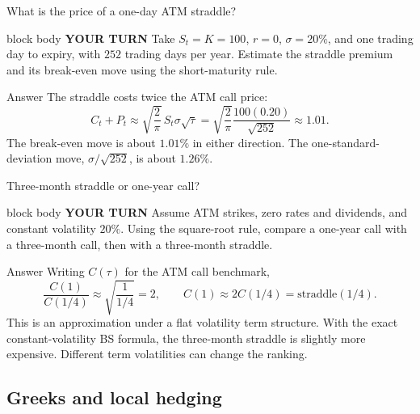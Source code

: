 \documentclass[handout,10pt,aspectratio=169]{beamer}
\newenvironment{pausebox}{\begin{beamercolorbox}[rounded=true,sep=0.8em,wd=\textwidth]{block body}
  \textbf{\color{CourseGold}YOUR TURN}\quad}{\end{beamercolorbox}}
\newcommand{\1}{\mathbf 1}
\begin{document}
\begin{frame}{What is the price of a one-day ATM straddle?}
\begin{pausebox}
Take \(S_t=K=100\), \(r=0\), \(\sigma=20\%\), and one trading day to
expiry, with \(252\) trading days per year. Estimate the straddle premium
and its break-even move using the short-maturity rule.
\end{pausebox}

\begin{exampleblock}{Answer}
The straddle costs twice the ATM call price:
\[
C_t+P_t\approx\sqrt{\frac2\pi}\,S_t\sigma\sqrt{\tau}
=\sqrt{\frac2\pi}\frac{100(0.20)}{\sqrt{252}}
\approx\boxed{1.01.}
\]
The break-even move is about \(1.01\%\) in either direction.
The one-standard-deviation move, \(\sigma/\sqrt{252}\), is about \(1.26\%\).
\end{exampleblock}
\end{frame}

\begin{frame}{Three-month straddle or one-year call?}
\begin{pausebox}
Assume ATM strikes, zero rates and dividends, and constant volatility
\(20\%\). Using the square-root rule, compare a one-year call with a
three-month call, then with a three-month straddle.
\end{pausebox}

\begin{exampleblock}{Answer}
Writing \(C(\tau)\) for the ATM call benchmark,
\[
\frac{C(1)}{C(1/4)}\approx\sqrt{\frac{1}{1/4}}=2,
\qquad
\boxed{C(1)\approx 2C(1/4)=\text{straddle}(1/4).}
\]
This is an approximation under a flat volatility term structure.
With the exact constant-volatility BS formula, the three-month straddle
is slightly more expensive. Different term volatilities can change the ranking.
\end{exampleblock}
\end{frame}

\subsection{Greeks and local hedging}
\end{document}
